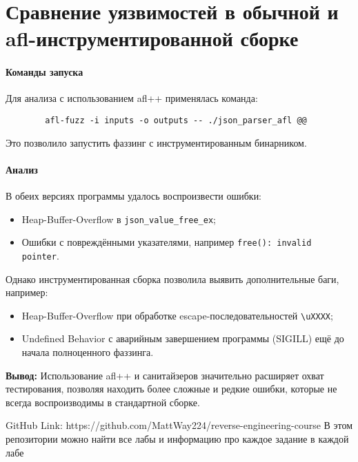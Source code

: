    \section{Сравнение уязвимостей в обычной и afl-инструментированной сборке}

    \paragraph{Команды запуска} Для анализа с использованием afl++ применялась команда:
    \begin{verbatim}
        afl-fuzz -i inputs -o outputs -- ./json_parser_afl @@
    \end{verbatim}
    Это позволило запустить фаззинг с инструментированным бинарником.

    \paragraph{Анализ} В обеих версиях программы удалось воспроизвести ошибки:
    \begin{itemize}
        \item Heap-Buffer-Overflow в \texttt{json\_value\_free\_ex};
        \item Ошибки с повреждёнными указателями, например \texttt{free(): invalid pointer}.
    \end{itemize}
    Однако инструментированная сборка позволила выявить дополнительные баги, например:
    \begin{itemize}
        \item Heap-Buffer-Overflow при обработке escape-последовательностей \texttt{\textbackslash uXXXX};
        \item Undefined Behavior с аварийным завершением программы (SIGILL) ещё до начала полноценного фаззинга.
    \end{itemize}

    \textbf{Вывод:} Использование afl++ и санитайзеров значительно расширяет охват тестирования, позволяя находить более сложные и редкие ошибки, которые не всегда воспроизводимы в стандартной сборке.

    \begin{thebibliography}{1}
        GitHub Link: https://github.com/MattWay224/reverse-engineering-course
        В этом репозитории можно найти все лабы и информацию про каждое задание в каждой лабе
    \end{thebibliography}

